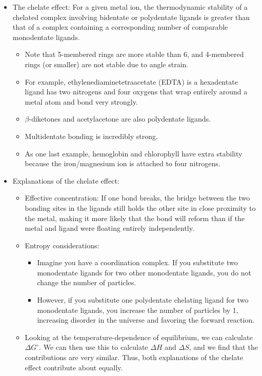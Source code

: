 \documentclass[../notes.tex]{subfiles}
\begin{document}
\begin{itemize}
\begin{itemize}
    \end{itemize}
    \item The chelate effect: For a given metal ion, the thermodynamic stability of a chelated complex involving bidentate or polydentate ligands is greater than that of a complex containing a corresponding number of comparable monodentate ligands.
    \begin{itemize}
        \item Note that 5-membered rings are more stable than 6, and 4-membered rings (or smaller) are not stable due to angle strain.
        \item For example, ethylenediaminetetraacetate (EDTA) is a hexadentate ligand has two nitrogens and four oxygens that wrap entirely around a metal atom and bond very strongly.
        \item $\beta$-diketones and acetylacetone are also polydentate ligands.
        \item Multidentate bonding is incredibly strong.
        \item As one last example, hemoglobin and chlorophyll have extra stability because the iron/magnesium ion is attached to four nitrogens.
    \end{itemize}
    \item Explanations of the chelate effect:
    \begin{itemize}
        \item Effective concentration: If one bond breaks, the bridge between the two bonding sites in the ligands still holds the other site in close proximity to the metal, making it more likely that the bond will reform than if the metal and ligand were floating entirely independently.
        \item Entropy considerations:
        \begin{itemize}
            \item Imagine you have a coordination complex. If you substitute two monodentate ligands for two other monodentate ligands, you do not change the number of particles.
            \item However, if you substitute one polydentate chelating ligand for two monodentate ligands, you increase the number of particles by 1, increasing disorder in the universe and favoring the forward reaction.
        \end{itemize}
        \item Looking at the temperature-dependence of equilibrium, we can calculate $\Delta G^\circ$. We can then use this to calculate $\Delta H$ and $\Delta S$, and we find that the contributions are very similar. Thus, both explanations of the chelate effect contribute about equally.

\end{itemize}
\end{itemize}
\end{document}
